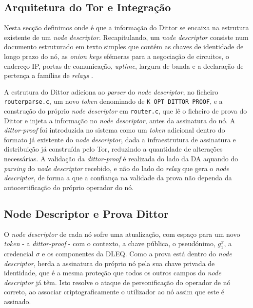\subsection{Arquitetura do Tor e Integração}
\label{sub:dittor_arquitetura_tor_integracao}

Nesta secção definimos onde é que a informação do Dittor se encaixa na estrutura existente de um \textit{node descriptor}. Recapitulando, um \textit{node descriptor} consiste num documento estruturado em texto simples que contém as chaves de identidade de longo prazo do nó, as \textit{onion keys} efémeras para a negociação de circuitos, o endereço IP, portas de comunicação, \textit{uptime}, largura de banda e a declaração de pertença a famílias de \textit{relays} \cite{tor_dirspec_serverdesc}.

A estrutura do Dittor adiciona ao \textit{parser} do \textit{node descriptor}, no ficheiro \texttt{routerparse.c}, um novo \textit{token} denominado de \texttt{K\_OPT\_DITTOR\_PROOF}, e a construção do próprio \textit{node descriptor} em \texttt{router.c}, que lê o ficheiro de prova do Dittor e injeta a informação no \textit{node descriptor}, antes da assinatura do nó. A \textit{dittor-proof} foi introduzida no sistema como um \textit{token} adicional dentro do formato já existente do \textit{node descriptor}, dada a infraestrutura de assinatura e distribuição já construída pelo Tor, reduzindo a quantidade de alterações necessárias. A validação da \textit{dittor-proof} é realizada do lado da DA aquando do \textit{parsing} do \textit{node descriptor} recebido, e não do lado do \textit{relay} que gera o \textit{node descriptor}, de forma a que a confiança na validade da prova não dependa da autocertificação do próprio operador do nó.

\subsection{Node Descriptor e Prova Dittor}
\label{sub:dittor_node_descriptor_prova}

O \textit{node descriptor} de cada nó sofre uma atualização, com espaço para um novo \textit{token} - a \textit{dittor-proof} - com o contexto, a chave pública, o pseudónimo, $g_1^x$, a credencial $\sigma$ e os componentes da DLEQ. Como a prova está dentro do \textit{node descriptor}, herda a assinatura do próprio nó pela sua chave privada de identidade, que é a mesma proteção que todos os outros campos do \textit{node descriptor} já têm. Isto resolve o ataque de personificação do operador de nó correto, ao associar criptograficamente o utilizador ao nó assim que este é assinado.

